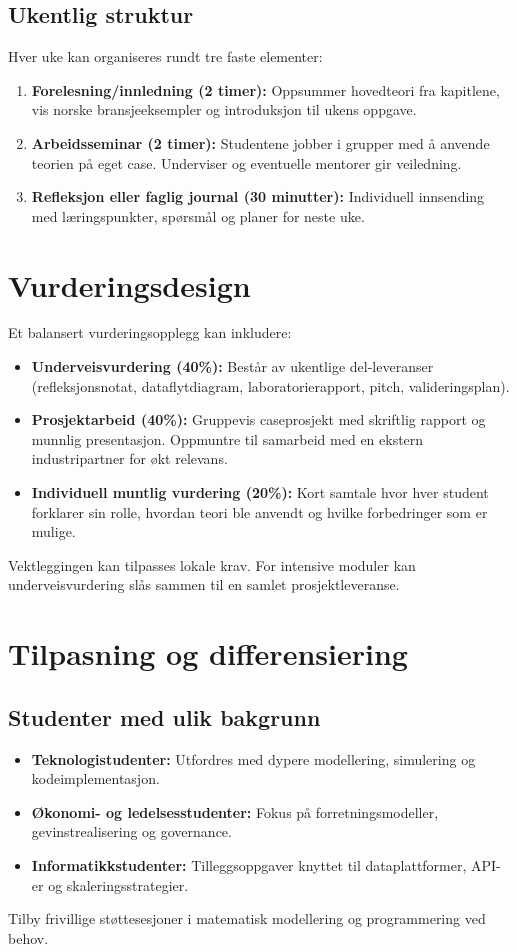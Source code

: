 \subsection{Ukentlig struktur}
Hver uke kan organiseres rundt tre faste elementer:
\begin{enumerate}
    \item \textbf{Forelesning/innledning (2 timer):} Oppsummer hovedteori fra kapitlene, vis norske bransjeeksempler og introduksjon til ukens oppgave.
    \item \textbf{Arbeidsseminar (2 timer):} Studentene jobber i grupper med å anvende teorien på eget case. Underviser og eventuelle mentorer gir veiledning.
    \item \textbf{Refleksjon eller faglig journal (30 minutter):} Individuell innsending med læringspunkter, spørsmål og planer for neste uke.
\end{enumerate}

\section{Vurderingsdesign}
Et balansert vurderingsopplegg kan inkludere:
\begin{itemize}
    \item \textbf{Underveisvurdering (40\%):} Består av ukentlige del-leveranser (refleksjonsnotat, dataflytdiagram, laboratorierapport, pitch, valideringsplan).
    \item \textbf{Prosjektarbeid (40\%):} Gruppevis caseprosjekt med skriftlig rapport og munnlig presentasjon. Oppmuntre til samarbeid med en ekstern industripartner for økt relevans.
    \item \textbf{Individuell muntlig vurdering (20\%):} Kort samtale hvor hver student forklarer sin rolle, hvordan teori ble anvendt og hvilke forbedringer som er mulige.
\end{itemize}
Vektleggingen kan tilpasses lokale krav. For intensive moduler kan underveisvurdering slås sammen til en samlet prosjektleveranse.

\section{Tilpasning og differensiering}
\subsection{Studenter med ulik bakgrunn}
\begin{itemize}
    \item \textbf{Teknologistudenter:} Utfordres med dypere modellering, simulering og kodeimplementasjon.
    \item \textbf{Økonomi- og ledelsesstudenter:} Fokus på forretningsmodeller, gevinstrealisering og governance.
    \item \textbf{Informatikkstudenter:} Tilleggsoppgaver knyttet til dataplattformer, API-er og skaleringsstrategier.
\end{itemize}
Tilby frivillige støttesesjoner i matematisk modellering og programmering ved behov.

